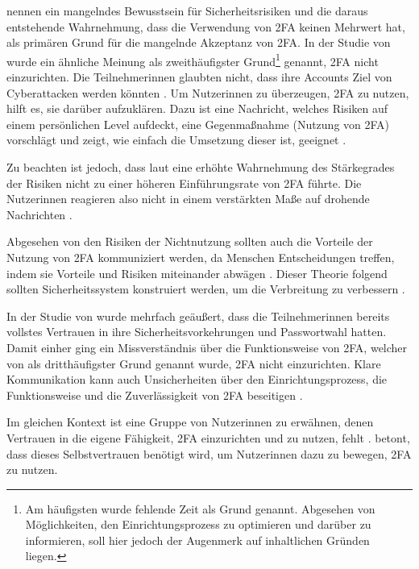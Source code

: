 \textcite{dasWhyJohnny2018} nennen ein mangelndes Bewusstsein für Sicherheitsrisiken und die daraus entstehende Wahrnehmung, dass die Verwendung von \ac{2FA} keinen Mehrwert hat, als primären Grund für die mangelnde Akzeptanz von \ac{2FA}. In der Studie von \textcite{ackermanImpedimentsAdoption2020} wurde ein ähnliche Meinung als zweithäufigster Grund\footnote{Am häufigsten wurde fehlende Zeit als Grund genannt. Abgesehen von Möglichkeiten, den Einrichtungsprozess zu optimieren und darüber zu informieren, soll hier jedoch der Augenmerk auf inhaltlichen Gründen liegen.} genannt, \ac{2FA} nicht einzurichten. Die Teilnehmerinnen glaubten nicht, dass ihre Accounts Ziel von Cyberattacken werden könnten \parencite{ackermanImpedimentsAdoption2020}. Um Nutzerinnen zu überzeugen, \ac{2FA} zu nutzen, hilft es, sie darüber aufzuklären. Dazu ist eine Nachricht, welches Risiken auf einem persönlichen Level aufdeckt, eine Gegenmaßnahme (Nutzung von \ac{2FA}) vorschlägt und zeigt, wie einfach die Umsetzung dieser ist, geeignet \parencite{ackermanImpedimentsAdoption2020}.

Zu beachten ist jedoch, dass laut \textcite{ackermanImpedimentsAdoption2020} eine erhöhte Wahrnehmung des Stärkegrades der Risiken nicht zu einer höheren Einführungsrate von \ac{2FA} führte. Die Nutzerinnen reagieren also nicht in einem verstärkten Maße auf drohende Nachrichten \parencite{ackermanImpedimentsAdoption2020}.

Abgesehen von den Risiken der Nichtnutzung sollten auch die Vorteile der Nutzung von \ac{2FA} kommuniziert werden, da Menschen Entscheidungen treffen, indem sie Vorteile und Risiken miteinander abwägen \parencite{dasWhyJohnny2018}. Dieser Theorie folgend sollten Sicherheitssystem konstruiert werden, um die Verbreitung zu verbessern \parencite{gargHeuristicsBiases2013}.

\pskip
In der Studie von \textcite{dasWhyJohnny2018} wurde mehrfach geäußert, dass die Teilnehmerinnen bereits vollstes Vertrauen in ihre Sicherheitsvorkehrungen und Passwortwahl hatten. Damit einher ging ein Missverständnis über die Funktionsweise von \ac{2FA}, welcher von \textcite{ackermanImpedimentsAdoption2020} als dritthäufigster Grund genannt wurde, \ac{2FA} nicht einzurichten. Klare Kommunikation kann auch Unsicherheiten über den Einrichtungsprozess, die Funktionsweise und die Zuverlässigkeit von \ac{2FA} beseitigen \parencite{ackermanImpedimentsAdoption2020}.

Im gleichen Kontext ist eine Gruppe von Nutzerinnen zu erwähnen, denen Vertrauen in die eigene Fähigkeit, \ac{2FA} einzurichten und zu nutzen, fehlt \parencite{ackermanImpedimentsAdoption2020}. \textcite{ackermanImpedimentsAdoption2020} betont, dass dieses Selbstvertrauen benötigt wird, um Nutzerinnen dazu zu bewegen, \ac{2FA} zu nutzen.


